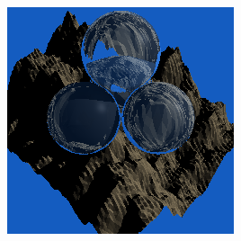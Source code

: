 \documentclass{article}
\begin{document}
\begin{center}
            \includegraphics[scale=0.54]{mount_high} 
        \end{center}
\end{document}

